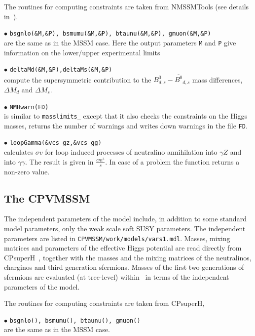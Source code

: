 \documentclass[12pt,a4paper]{article}
\begin{document}
The routines for computing constraints are taken from NMSSMTools (see details  in~\cite{Belanger:2006is}).

\noindent
$\bullet$ {\tt bsgnlo(\&M,\&P), bsmumu(\&M,\&P), btaunu(\&M,\&P),  gmuon(\&M,\&P)}\\ 
are the same as in the MSSM case.  Here the output parameters {\tt M} and {\tt P} 
give information on the lower/upper experimental limits~\cite{Domingo:2007dx}



\noindent$\bullet$ {\tt deltaMd(\&M,\&P),deltaMs(\&M,\&P)}\\
compute the supersymmetric contribution to the $B^0_{d,s}-\overline{B^0}_{d,s}$ mass differences, $\Delta M_d$ and $\Delta M_s$.

\noindent$\bullet$ \verb|NMHwarn(FD)|\\
is similar to {\tt masslimits\_} except that it also checks the 
constraints on the Higgs masses, returns the number of warnings and 
writes down  warnings in the file \verb|FD|.  

\noi$\bullet$ \verb|loopGamma(&vcs_gz,&vcs_gg)|\\
calculates $\sigma v$ for  loop induced processes of neutralino
annihilation into $\gamma Z$ and into $\gamma \gamma$. The result is given in  
$\frac{cm^3}{s}$. In case of a problem the function returns a non-zero value. 


\subsection{The CPVMSSM}

The independent parameters of the model include,
in addition to some standard model parameters, only the weak scale soft SUSY parameters.
The independent parameters are listed in \verb|CPVMSSM/work/models/vars1.mdl|. 
Masses,
mixing matrices and parameters of the effective Higgs potential are read
directly from CPsuperH~\cite{Lee:2003nta,Lee:2007gn}, together with the masses and
the mixing matrices of the neutralinos, charginos and third generation
sfermions.  Masses of the first two generations
of sfermions are evaluated (at tree-level) within \micro\ in
terms of the independent parameters of the model.

The routines for computing constraints are taken from CPsuperH,~\cite{CPSUPERH}


\noindent
$\bullet$ {\tt bsgnlo(), bsmumu(), btaunu(), gmuon() }\\  
are the same as in the MSSM case.\\
\end{document}
